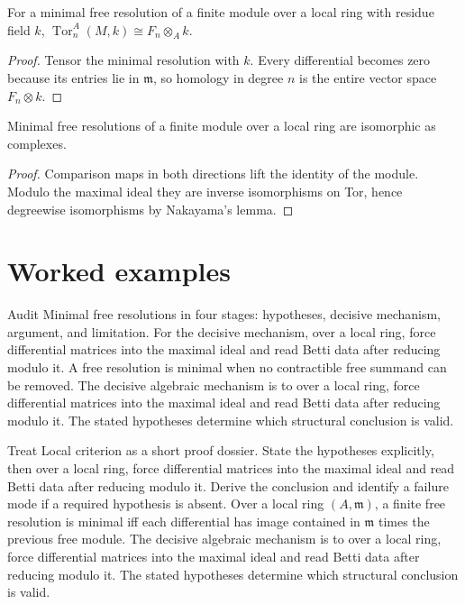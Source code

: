 \begin{theorem}\label{thm:v25-02}
For a minimal free resolution of a finite module over a local ring with residue field $k$, $\operatorname{Tor}_n^A(M,k)\cong F_n\otimes_A k$.
\begin{proof}
Tensor the minimal resolution with $k$. Every differential becomes zero because its entries lie in $\mathfrak m$, so homology in degree $n$ is the entire vector space $F_n\otimes k$.
\end{proof}
\end{theorem}

\begin{theorem}\label{thm:v25-03}
Minimal free resolutions of a finite module over a local ring are isomorphic as complexes.
\begin{proof}
Comparison maps in both directions lift the identity of the module. Modulo the maximal ideal they are inverse isomorphisms on Tor, hence degreewise isomorphisms by Nakayama's lemma.
\end{proof}
\end{theorem}

\section{Worked examples}

\begin{example}\label{ex:v25-worked-01}
Audit Minimal free resolutions in four stages: hypotheses, decisive mechanism, argument, and limitation. For the decisive mechanism, over a local ring, force differential matrices into the maximal ideal and read Betti data after reducing modulo it. A free resolution is minimal when no contractible free summand can be removed. The decisive algebraic mechanism is to over a local ring, force differential matrices into the maximal ideal and read Betti data after reducing modulo it. The stated hypotheses determine which structural conclusion is valid.
\end{example}

\begin{example}\label{ex:v25-worked-02}
Treat Local criterion as a short proof dossier. State the hypotheses explicitly, then over a local ring, force differential matrices into the maximal ideal and read Betti data after reducing modulo it. Derive the conclusion and identify a failure mode if a required hypothesis is absent. Over a local ring $(A,\mathfrak m)$, a finite free resolution is minimal iff each differential has image contained in $\mathfrak m$ times the previous free module. The decisive algebraic mechanism is to over a local ring, force differential matrices into the maximal ideal and read Betti data after reducing modulo it. The stated hypotheses determine which structural conclusion is valid.
\end{example}

